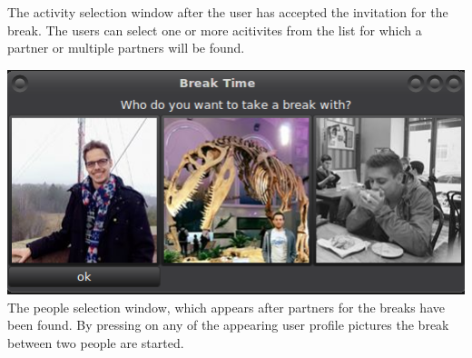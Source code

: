 \documentclass[english]{tktltiki}
\begin{document}
\begin{center}
		The activity selection window after the user has accepted the invitation for the break. The users can select one or more acitivites from the list for which a partner or multiple partners will be found. 
		
		\includegraphics[width=1\textwidth]{images/app-screenshots/people-selection-cropped.png} \\
		
		The people selection window, which appears after partners for the breaks have been found. By pressing on any of the appearing user profile pictures the break between two people are started.
	\end{center}
	
\end{document}
